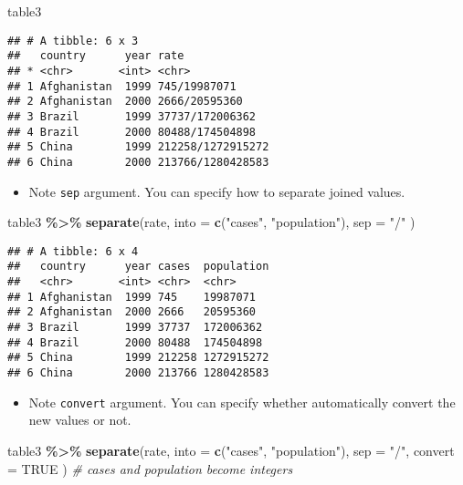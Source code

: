\documentclass[
]{book}
\newenvironment{Shaded}{\begin{snugshade}}{\end{snugshade}}
\newcommand{\CommentTok}[1]{\textcolor[rgb]{0.56,0.35,0.01}{\textit{#1}}}
\newcommand{\DataTypeTok}[1]{\textcolor[rgb]{0.13,0.29,0.53}{#1}}
\newcommand{\KeywordTok}[1]{\textcolor[rgb]{0.13,0.29,0.53}{\textbf{#1}}}
\newcommand{\NormalTok}[1]{#1}
\newcommand{\OperatorTok}[1]{\textcolor[rgb]{0.81,0.36,0.00}{\textbf{#1}}}
\newcommand{\OtherTok}[1]{\textcolor[rgb]{0.56,0.35,0.01}{#1}}
\newcommand{\StringTok}[1]{\textcolor[rgb]{0.31,0.60,0.02}{#1}}
\providecommand{\tightlist}{%
  \setlength{\itemsep}{0pt}\setlength{\parskip}{0pt}}
\begin{document}
\begin{Shaded}
\begin{Highlighting}[]
\NormalTok{table3}
\end{Highlighting}
\end{Shaded}

\begin{verbatim}
## # A tibble: 6 x 3
##   country      year rate             
## * <chr>       <int> <chr>            
## 1 Afghanistan  1999 745/19987071     
## 2 Afghanistan  2000 2666/20595360    
## 3 Brazil       1999 37737/172006362  
## 4 Brazil       2000 80488/174504898  
## 5 China        1999 212258/1272915272
## 6 China        2000 213766/1280428583
\end{verbatim}

\begin{itemize}
\tightlist
\item
  Note \texttt{sep} argument. You can specify how to separate joined values.
\end{itemize}

\begin{Shaded}
\begin{Highlighting}[]
\NormalTok{table3 }\OperatorTok{\%\textgreater{}\%}
\StringTok{  }\KeywordTok{separate}\NormalTok{(rate,}
    \DataTypeTok{into =} \KeywordTok{c}\NormalTok{(}\StringTok{"cases"}\NormalTok{, }\StringTok{"population"}\NormalTok{),}
    \DataTypeTok{sep =} \StringTok{"/"}
\NormalTok{  )}
\end{Highlighting}
\end{Shaded}

\begin{verbatim}
## # A tibble: 6 x 4
##   country      year cases  population
##   <chr>       <int> <chr>  <chr>     
## 1 Afghanistan  1999 745    19987071  
## 2 Afghanistan  2000 2666   20595360  
## 3 Brazil       1999 37737  172006362 
## 4 Brazil       2000 80488  174504898 
## 5 China        1999 212258 1272915272
## 6 China        2000 213766 1280428583
\end{verbatim}

\begin{itemize}
\tightlist
\item
  Note \texttt{convert} argument. You can specify whether automatically convert the new values or not.
\end{itemize}

\begin{Shaded}
\begin{Highlighting}[]
\NormalTok{table3 }\OperatorTok{\%\textgreater{}\%}
\StringTok{  }\KeywordTok{separate}\NormalTok{(rate,}
    \DataTypeTok{into =} \KeywordTok{c}\NormalTok{(}\StringTok{"cases"}\NormalTok{, }\StringTok{"population"}\NormalTok{),}
    \DataTypeTok{sep =} \StringTok{"/"}\NormalTok{,}
    \DataTypeTok{convert =} \OtherTok{TRUE}
\NormalTok{  ) }\CommentTok{\# cases and population become integers}
\end{Highlighting}
\end{Shaded}
\end{document}
